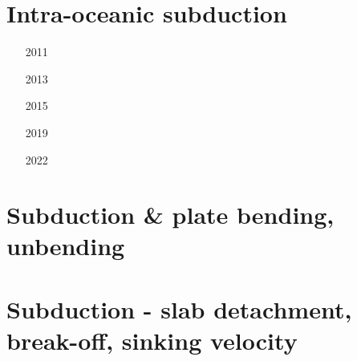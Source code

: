 \section{Intra-oceanic subduction}


\begin{scriptsize}
\begin{itemize}
\item[2011]
\textcite{gery11b} 
\item[2013]
\textcite{simi13} 
\item[2015]
\textcite{vapm15} 
\textcite{matv15} 
\item[2019]
\textcite{begb19} 
\item[2022]
\textcite{licw22} 
\end{itemize}
\end{scriptsize}




\section{Subduction \& plate bending, unbending}

\begin{scriptsize}
\begin{itemize}
\item[\nineteenninetynine]
\textcite{coha99} 
\item[\twothousandsix]
\textcite{buff06} 
\item[\twothousandeight]
\textcite{wuch08} 
\item[\twothousandnine]
\textcite{fagb09} 
\item[\twothousandtwelve]
\textcite{camo12} 
\textcite{fagm12} 
\textcite{bube12} 
\item[\twothousandfourteen]
\textcite{fogm14} 
\item[\twothousandnineteen]
\textcite{gert19} 
\item[\twothousandtwentyone]
\textcite{sabg21} 
\end{itemize}
\end{scriptsize}



\section{Subduction - slab detachment, break-off, sinking velocity}

